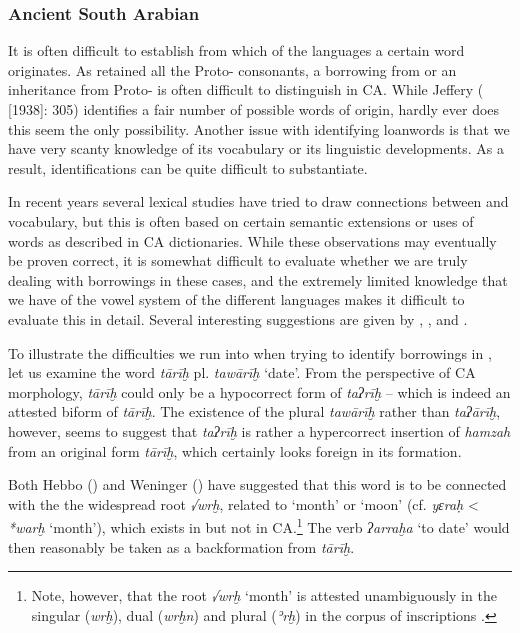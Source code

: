\documentclass[output=paper]{langsci/langscibook}
\begin{document}
\subsubsection{\label{bkm:Ref13224682}Ancient South Arabian}

It is often difficult to establish from which of the  languages a certain word originates. As  retained all the Proto- consonants, a borrowing from  or an inheritance from Proto- is often difficult to distinguish in CA. While Jeffery (\citeyear{Jeffrey2007} [1938]: 305) identifies a fair number of possible words of  origin, hardly ever does this seem the only possibility. Another issue with identifying  {loanwords} is that we have very scanty knowledge of its vocabulary or its linguistic developments. As a result,  identifications can be quite difficult to substantiate.

In recent years several lexical studies have tried to draw connections between  and  vocabulary, but this is often based on certain semantic extensions or uses of words as described in CA dictionaries. While these observations may eventually be proven correct, it is somewhat difficult to evaluate whether we are truly dealing with borrowings in these cases, and the extremely limited knowledge that we have of the vowel system of the different  languages makes it difficult to evaluate this in detail. Several interesting suggestions are given by  \cite{Weninger2009},  \cite{Hayajneh2011},  \cite{Elmaz2014} and  \cite{Elmaz2016}. 

To illustrate the difficulties we run into when trying to identify  borrowings in , let us examine the word \textit{tārīḫ} pl. \textit{tawārīḫ} ‘date’. From the perspective of CA morphology, \textit{tārīḫ} could only be a hypocorrect form of \textit{taʔrīḫ} – which is indeed an attested biform of \textit{tārīḫ}. The existence of the plural \textit{tawārīḫ} rather than \textit{taʔārīḫ}, however, seems to suggest that \textit{taʔrīḫ} is rather a hypercorrect insertion of \textit{hamzah} from an original form \textit{tārīḫ}, which certainly looks foreign in its {formation}.

Both Hebbo (\citeyear[27]{Hebbo1984}) and Weninger (\citeyear[399]{Weninger2009}) have suggested that this word is to be connected with the the widespread  {root} \textit{√wrḫ}, related to ‘month’ or ‘moon’ (cf.  \textit{yɛraḥ} < \textit{*warḫ} ‘month’), which exists in  but not in CA.\footnote{Note, however, that the {root} \textit{√wrḫ} ‘month’ is attested unambiguously in the singular (\textit{wrḫ}), dual (\textit{wrḫn}) and plural (\textit{ʾrḫ}) in the   corpus of  inscriptions \citep[353]{Al-Jallad2015Safaitic}.} The verb \textit{ʔarraḫa} ‘to date’ would then reasonably be taken as a backformation from \textit{tārīḫ}.
\end{document}
